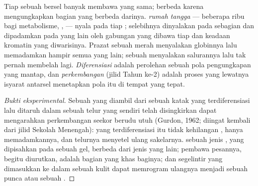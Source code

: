 \begin{proposition}\label{prop:b1:expression-control:differentiation}
Tiap  sebuah  bersel banyak membawa  yang sama;
 berbeda karena mengungkapkan bagian yang berbeda darinya. 
\emph{rumah tangga} --- beberapa ribu bagi metabolisme, ,  --- nyala pada tiap ; selebihnya dinyalakan pada sebagian 
dan dipadamkan pada yang lain oleh gabungan  yang
dibawa tiap  dan keadaan kromatin yang diwarisinya. Prazat sebuah
 merah menyalakan globinnya lalu memadamkan hampir semua yang lain;
sebuah  menyalakan salurannya lalu tak pernah membelah lagi.
\emph{Diferensiasi} adalah perolehan sebuah pola pengungkapan yang
mantap, dan \emph{perkembangan} (jilid Tahun ke-2) adalah proses yang
lewatnya isyarat antarsel menetapkan pola itu di tempat yang tepat.
\end{proposition}
\begin{proof}[Bukti eksperimental]
Sebuah  yang diambil dari sebuah  katak yang terdiferensiasi
lalu ditaruh dalam sebuah  telur yang  sendiri telah
disingkirkan dapat mengarahkan perkembangan seekor berudu utuh
(Gurdon, 1962; diingat kembali dari jilid Sekolah Menengah):  yang
terdiferensiasi itu tidak kehilangan , hanya memadamkannya, dan
  telurnya menyetel ulang sakelarnya.  sebuah jenis
, yang dipisahkan pada sebuah gel, berbeda dari  jenis yang
lain; pembawa pesannya, begitu diurutkan, adalah bagian  yang
khas baginya; dan segelintir  yang dimasukkan ke
dalam sebuah  kulit dapat memrogram ulangnya menjadi sebuah 
punca atau sebuah .
\end{proof}


